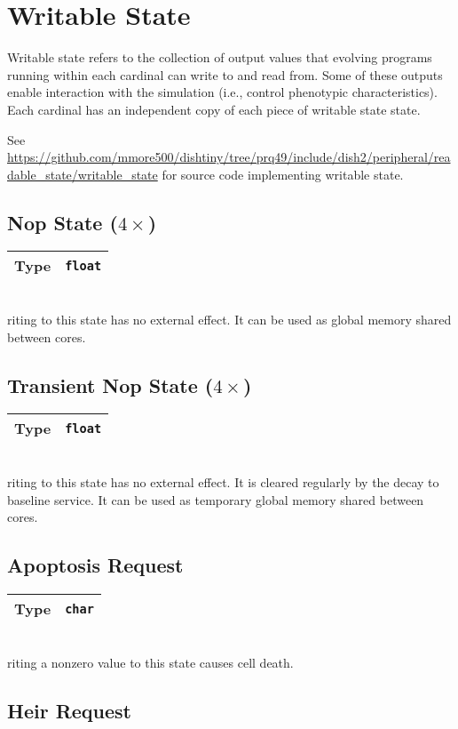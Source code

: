 \newcommand{\writablestatedef}[2]{
    \begin{tabular}{|
        >{\columncolor[HTML]{C0C0C0}}l |l|}
        \hline
        Type & \texttt{#1} \\ \hline
    \end{tabular} \\
}

\section{Writable State}

Writable state refers to the collection of output values that evolving programs running within each cardinal can write to and read from.
Some of these outputs enable interaction with the simulation (i.e., control phenotypic characteristics).
Each cardinal has an independent copy of each piece of writable state state.

See \url{https://github.com/mmore500/dishtiny/tree/prq49/include/dish2/peripheral/readable_state/writable_state} for source code implementing writable state.

\subsection{Nop State ($4\times$)}

\writablestatedef{float}

Writing to this state has no external effect.
It can be used as global memory shared between cores.

\subsection{Transient Nop State ($4\times$)}

\writablestatedef{float}

Writing to this state has no external effect.
It is cleared regularly by the decay to baseline service.
It can be used as temporary global memory shared between cores.

\subsection{Apoptosis Request}

\writablestatedef{char}

Writing a nonzero value to this state causes cell death.

\subsection{Heir Request}

